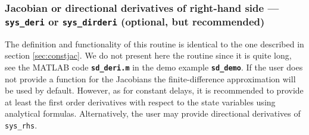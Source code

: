 \documentclass[10pt]{scrartcl}
\newcommand{\file}[1]{\textbf{\texttt{#1}}}
\newcommand{\blist}[1]{\mbox{\lstinline!#1!}}
\begin{document}


\subsubsection{Jacobian or directional derivatives of right-hand side
  --- \texorpdfstring{\blist{sys_deri}}{sys\_deri} or
  \texorpdfstring{\blist{sys_dirderi}}{sys\_dirderi} (optional, but
  recommended)}
\label{sec:sdjac}
The definition and functionality of this routine is identical to the
one described in section \ref{sec:constjac}.  We do not present here
the routine since it is quite long, see the MATLAB code
\file{sd\_deri.m} in the demo example \file{sd\_demo}. If the user
does not provide a function for the Jacobians the finite-difference
approximation will be used by default.  However, as for constant
delays, it is recommended to provide at least the first order
derivatives with respect to the state variables using analytical
formulas. Alternatively, the user may provide directional derivatives
of \blist{sys_rhs}.
\end{document}
